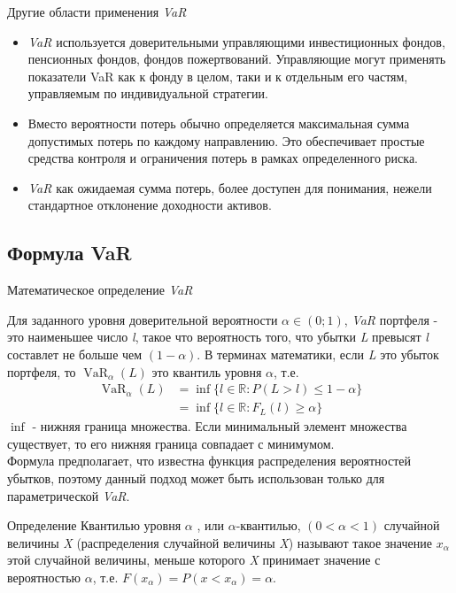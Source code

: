 \documentclass[financial_risks_lectures.tex]{subfiles}
\begin{document}
\begin{frame}[shrink=10]{Другие области применения \textit{VaR}}
 \begin{itemize}[<+->]
 \item 
\textit{VaR }используется доверительными управляющими инвестиционных фондов, пенсионных фондов, фондов пожертвований. Управляющие могут применять показатели VaR как к фонду в целом, таки и к отдельным его частям, управляемым по индивидуальной стратегии.  
\item
Вместо вероятности потерь обычно определяется максимальная сумма допустимых потерь по каждому направлению. Это обеспечивает простые средства контроля и ограничения потерь в рамках определенного риска. 
\item
\textit{VaR }как ожидаемая сумма потерь, более доступен для понимания, нежели стандартное отклонение доходности активов.

 \end{itemize}
\end{frame}
\subsection{Формула VaR}
\begin{frame}[shrink=10]{Математическое определение \textit{VaR}}

Для заданного уровня доверительной вероятности $\alpha\in (0;1)$, \textit{VaR} портфеля - это наименьшее число \textit{l}, такое что вероятность того, что убытки \textit{L} превысят \textit{l} составлет не больше чем $(1-\alpha)$.
В терминах математики, если \textit{L} это убыток портфеля, то $\operatorname{VaR}_{\alpha}(L)$ это квантиль уровня $\alpha$, т.е.
\begin{align}
\operatorname{VaR}_\alpha(L) & \nonumber
=\inf\{l \in \mathbb{R}:P(L>l)\le 1-\alpha\}\\ &
=\inf\{l\in \mathbb{R}:F_L(l) \ge \alpha\}\end{align}
$\inf$ - нижняя граница множества. Если минимальный элемент множества существует, то его нижняя граница совпадает с минимумом.\\
Формула предполагает, что известна функция распределения вероятностей убытков, поэтому данный подход может быть использован только для параметрической \textit{VaR}.
\end{frame}
\begin{frame}
\begin{block}{Определение}
Квантилью уровня $\alpha$ , или $\alpha$-квантилью, $(0<\alpha<1)$ случайной величины \textit{X} (распределения случайной величины \textit{X}) называют такое значение $x_{\alpha}$ этой случайной величины, меньше которого \textit{X} принимает значение с вероятностью $\alpha$, т.е. $F(x_{\alpha}) = P(x < x_{\alpha}) = \alpha$. 
\end{block}
\end{frame}
\end{document}
